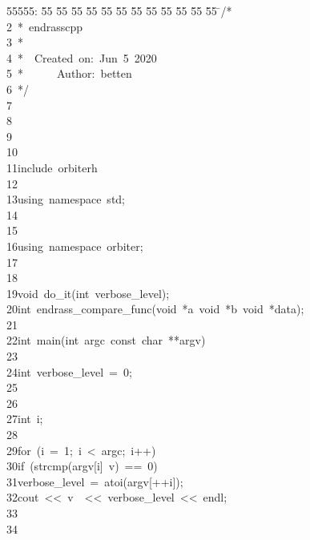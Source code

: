 %
%
\begin{tabbing}
55555: \= 55 \= 55 \= 55 \= 55 \= 55 \= 55 \= 55 \= 55 \= 55 \= 55 \= 55 \= 55 \= \>/*\\[0pt]
2\>\ *\ endrasscpp\\[0pt]
3\>\ *\\[0pt]
4\>\ *\ \ Created\ on:\ Jun\ 5\ 2020\\[0pt]
5\>\ *\ \ \ \ \ \ Author:\ betten\\[0pt]
6\>\ */\\[0pt]
7\>\\[0pt]
8\>\\[0pt]
9\>\\[0pt]
10\>\\[0pt]
11\>include\ orbiterh\\[0pt]
12\>\\[0pt]
13\>using\ namespace\ std;\\[0pt]
14\>\\[0pt]
15\>\\[0pt]
16\>using\ namespace\ orbiter;\\[0pt]
17\>\\[0pt]
18\>\\[0pt]
19\>void\ do\_it(int\ verbose\_level);\\[0pt]
20\>int\ endrass\_compare\_func(void\ *a\ void\ *b\ void\ *data);\\[0pt]
21\>\\[0pt]
22\>int\ main(int\ argc\ const\ char\ **argv)\\[0pt]
23\>\\[0pt]
24\>\>int\ verbose\_level\ =\ 0;\\[0pt]
25\>\\[0pt]
26\>\\[0pt]
27\>\>int\ i;\\[0pt]
28\>\\[0pt]
29\>\>for\ (i\ =\ 1;\ i\ <\ argc;\ i++)\ \\[0pt]
30\>\>\>if\ (strcmp(argv[i]\ v)\ ==\ 0)\ \\[0pt]
31\>\>\>\>verbose\_level\ =\ atoi(argv[++i]);\\[0pt]
32\>\>\>\>cout\ <<\ v\ \ <<\ verbose\_level\ <<\ endl;\\[0pt]
33\>\>\>\>\\[0pt]
34\>\>\>\\[0pt]

\end{tabbing}
